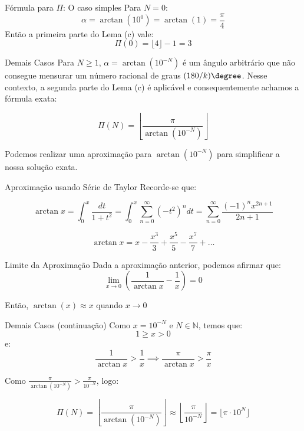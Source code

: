 \documentclass{beamer}
\begin{document}
\begin{frame}{Fórmula para $\Pi$: O caso simples}
    Para $N=0$:
    $$
    \alpha  = \arctan(10^0) = \arctan(1) = \frac{\pi}{4}
    $$
    \vspace{}
    Então a primeira parte do Lema (c) vale: 
    $$
    \Pi(0)=\lfloor4\rfloor - 1 = 3
    $$ 
\end{frame}

\begin{frame}{Demais Casos}
    Para $N\ge1$, $\alpha = \arctan(10^{-N})$ é um ângulo arbitrário que não consegue mensurar um número racional de graus $(180/k)\degree$. Nesse contexto, a segunda parte do Lema (c) é aplicável e consequentemente achamos a fórmula exata:
    
    $$
    \Pi(N) = \left\lfloor\frac{\pi}{\arctan(10^{-N})}\right\rfloor
    $$
    
    Podemos realizar uma aproximação para $\arctan(10^{-N})$ para simplificar a nossa solução exata. 
\end{frame}

\begin{frame}{Aproximação usando Série de Taylor}
    Recorde-se que:
    
    $$
    \arctan{x} = \int^x_0{\frac{dt}{1+t^2}} = \int^x_0 \sum^{\infty}_{n=0}(-t^2)^ndt = \sum^{\infty}_{n=0}\frac{(-1)^nx^{2n+1}}{2n+1}
    $$
    
    $$
    \arctan{x} = x - \frac{x^3}{3} + \frac{x^5}{5} - \frac{x^7}{7} + \dots
    $$
\end{frame}

\begin{frame}{Limite da Aproximação}
  Dada a aproximação anterior, podemos afirmar que:
$$
\lim_{x\rightarrow 0}\left( \frac{1}{\arctan{x}} - \frac{1}{x} \right)= 0
$$

Então, $\arctan(x) \approx x$ quando $x \rightarrow 0$
\end{frame}

\begin{frame}{Demais Casos (continuação)}
Como $x = 10^{-N}$ e $N \in \mathbb{N}$, temos que:
$$
1\geq x>0
$$
e:
$$
\frac{1}{\arctan{x}} > \frac{1}{x} \implies \frac{\pi}{\arctan{x}} > \frac{\pi}{x}
$$


Como $\frac{\pi}{\arctan(10^{-N})}>\frac{\pi}{10^{-N}}$, logo:

$$
\Pi(N) = \left\lfloor \frac{\pi}{\arctan(10^{-N})}\right\rfloor\approx \left\lfloor \frac{\pi}{10^{-N}}\right\rfloor = \lfloor\pi \cdot 10^{N}
\rfloor$$

\end{frame}
\end{document}
